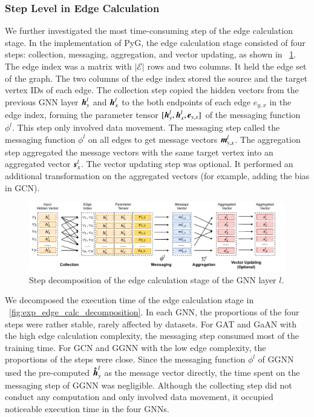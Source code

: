 \subsubsection{Step Level in Edge Calculation}

We further investigated the most time-consuming step of the edge calculation stage.
%
In the implementation of PyG, the edge calculation stage consisted of four steps: collection, messaging, aggregation, and vector updating, as shown in \figurename~\ref{fig:steps_in_edge_calculation}.
%
The edge index was a matrix with $|\mathcal{E}|$ rows and two columns.
%
It held the edge set of the graph.
%
The two columns of the edge index stored the source and the target vertex IDs of each edge.
%
The collection step copied the hidden vectors from the previous GNN layer $\boldsymbol{h}^l_y$ and $\boldsymbol{h}^l_x$ to the both endpoints of each edge $e_{y,x}$ in the edge index, forming the parameter tensor $[\boldsymbol{h}^l_{y}, \boldsymbol{h}^l_{x}, \boldsymbol{e}_{y,x}]$ of the messaging function $\phi^l$.
%
This step only involved data movement.
%
The messaging step called the messaging function $\phi^l$ on all edges to get message vectors $\boldsymbol{m}^l_{y,x}$.
%
The aggregation step aggregated the message vectors with the same target vertex into an aggregated vector $\boldsymbol{s}^l_x$.
%
The vector updating step was optional.
%
It performed an additional transformation on the aggregated vectors (for example, adding the bias in GCN).

\begin{figure}[H]
    \centering
    \includegraphics[width=1\columnwidth]{figs/illustration/steps_in_edge_calculation.pdf}
    \caption{Step decomposition of the edge calculation stage of the GNN layer $l$.}
    \label{fig:steps_in_edge_calculation}
\end{figure}

We decomposed the execution time of the edge calculation stage in \figurename~\ref{fig:exp_edge_calc_decomposition}.
%
In each GNN, the proportions of the four steps were rather stable, rarely affected by datasets. 
%
For GAT and GaAN with the high edge calculation complexity, the messaging step consumed most of the training time. 
%
For GCN and GGNN with the low edge complexity, the proportions of the steps were close. 
%
Since the messaging function $\phi^l$ of GGNN used the pre-computed $\boldsymbol{\hat{h}}^l_y$ as the message vector directly, the time spent on the messaging step of GGNN was negligible.
%
Although the collecting step did not conduct any computation and only involved data movement, it occupied noticeable execution time in the four GNNs.

